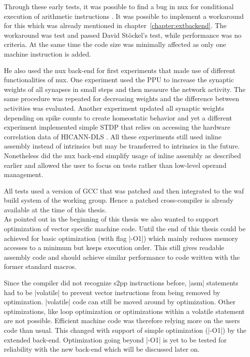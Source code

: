 Through these early tests, it was possible to find a bug in nux for conditional execution of arithmetic instructions \cite{reponux}.
It was possible to implement a workaround for this which was already mentioned in chapter~\ref{chapter:extbackend}.
The workaround was test and passed David Stöckel's test, while performance was no criteria.
At the same time the code size was minimally affected as only one machine instruction is added.

He also used the nux back-end for first experiments that made use of different functionalities of nux.
One experiment used the \ac{PPU} to increase the synaptic weights of all synapses in small steps and then measure the network activity.
The same procedure was repeated for decreasing weights and the difference between activities was evaluated.
Another experiment updated all synaptic weights depending on spike counts to create homeostatic behavior \cite{repohomeostasis} and yet a different experiment implemented simple \ac{STDP} that relies on accessing the hardware correlation data of \ac{HICANN-DLS} \cite{repostdp}.
All these experiments still used inline assembly instead of intrinsics but may be transferred to intrinsics in the future.
Nonetheless did the nux back-end simplify usage of inline assembly as described earlier and allowed the user to focus on tests rather than low-level operand management.

All tests used a version of \ac{GCC} that was patched and then integrated to the waf build system of the working group.
Hence a patched cross-compiler is already available at the time of this thesis.
\\
As pointed out in the beginning of this thesis we also wanted to support optimization of vector specific machine code.
Until the end of this thesis could be achieved for basic optimization (with flag |-O1|) which mainly reduces memory accesses to a minimum but keeps execution order.
This still gives readable assembly code and should achieve similar performance to code written with the former standard macros.

Since the compiler did not recognize \ac{s2pp} instructions before, |asm| statements had to be |volatile| to prevent vector instructions from being removed by optimization.
|volatile| code can still be moved around by optimization.
Other optimizations, like loop optimization or optimizations within a volatile statement are not possible.
Efficient machine code was therefore relying more on the users code than usual.
This changed with support of simple optimization (|-O1|) by the extended back-end.
Optimization going beyond |-O1| is yet to be tested for reliability with the new back-end which will be discussed later on.

